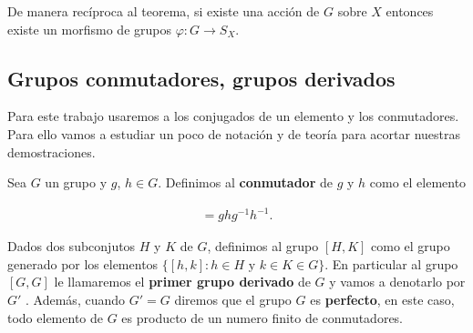 	\begin{nt}
	De manera recíproca al teorema, si existe una acción de $G$ sobre $X$ entonces existe un morfismo de grupos $\varphi:G \to S_X$.  
	\end{nt}
	
\subsection*{Grupos conmutadores, grupos derivados}
Para este trabajo usaremos a los conjugados de un elemento y los conmutadores. Para ello vamos a estudiar un poco de notación y de teoría para acortar nuestras demostraciones. 

\begin{df}
Sea $G$ un grupo y $g$, $h \in G$. Definimos al \textbf{conmutador} de $g$ y $h$ como el elemento 

\begin{align*}
[g,h]=ghg^{-1}h^{-1}.
\end{align*}

Dados dos subconjutos $H$ y $K$ de $G$, definimos al grupo $[H,K]$ como el grupo generado por los elementos $\{[h,k]:h \in H \text{ y }k \in K \in G \}$. En particular al grupo $[G,G]$ le llamaremos el \textbf{primer grupo derivado} de $G$ y vamos a denotarlo por $G'$ . Además, cuando $ G' = G $ diremos que el grupo $G$ es \textbf{perfecto}, en este caso, todo elemento de $G$ es producto de un numero finito de conmutadores. 
\end{df}
	
